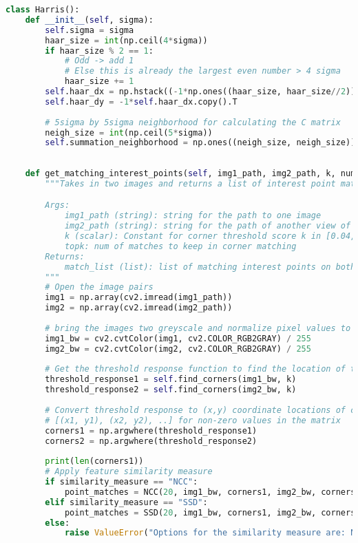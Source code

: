 \documentclass{article}
\begin{document}
\begin{lstlisting}[language=Python]
class Harris():
    def __init__(self, sigma):
        self.sigma = sigma
        haar_size = int(np.ceil(4*sigma))
        if haar_size % 2 == 1:
            # Odd -> add 1
            # Else this is already the largest even number > 4 sigma
            haar_size += 1
        self.haar_dx = np.hstack((-1*np.ones((haar_size, haar_size//2)), np.ones((haar_size, haar_size//2))))
        self.haar_dy = -1*self.haar_dx.copy().T
        
        # 5sigma by 5sigma neighborhood for calculating the C matrix
        neigh_size = int(np.ceil(5*sigma))
        self.summation_neighborhood = np.ones((neigh_size, neigh_size))
        
        
    def get_matching_interest_points(self, img1_path, img2_path, k, num_matches, similarity_measure="NCC"):
        """Takes in two images and returns a list of interest point matches

        Args:
            img1_path (string): string for the path to one image
            img2_path (string): string for the path of another view of the previous image
            k (scalar): Constant for corner threshold score k in [0.04, 0.06]
            topk: num of matches to keep in corner matching
        Returns:
            match_list (list): list of matching interest points on both images  
        """
        # Open the image pairs
        img1 = np.array(cv2.imread(img1_path))
        img2 = np.array(cv2.imread(img2_path))
        
        # bring the images two greyscale and normalize pixel values to 0,1
        img1_bw = cv2.cvtColor(img1, cv2.COLOR_RGB2GRAY) / 255
        img2_bw = cv2.cvtColor(img2, cv2.COLOR_RGB2GRAY) / 255
        
        # Get the threshold response function to find the location of the corners
        threshold_response1 = self.find_corners(img1_bw, k)
        threshold_response2 = self.find_corners(img2_bw, k)
        
        # Convert threshold response to (x,y) coordinate locations of corners: 
        # [(x1, y1), (x2, y2), ..] for non-zero values in the matrix
        corners1 = np.argwhere(threshold_response1)
        corners2 = np.argwhere(threshold_response2)
    
        print(len(corners1))
        # Apply feature similarity measure
        if similarity_measure == "NCC":
            point_matches = NCC(20, img1_bw, corners1, img2_bw, corners2, num_matches)
        elif similarity_measure == "SSD":
            point_matches = SSD(20, img1_bw, corners1, img2_bw, corners2, num_matches)
        else:
            raise ValueError("Options for the similarity measure are: NCC and SSD")
        

\end{lstlisting}
\end{document}

